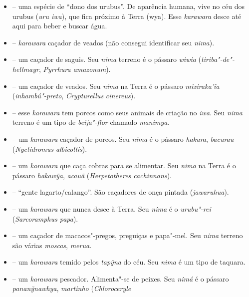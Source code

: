 \begin{itemize}
  principalmente na ilha de Marajó. Os Guajá, embora estejam
  relativamente distantes da região endêmica dessa ave, disseram que a
  conhecem.
\item
  \emph{} -- uma espécie de ``dono dos urubus''. De
  aparência humana, vive no céu dos urubus (\emph{uru iwa}), que fica
  próximo à Terra (wya). Esse \emph{karawara} desce até aqui para beber
  e buscar água.
\item
  \emph{} -- \emph{karawara} caçador de veados (não
  consegui identificar seu \emph{nima}).
\item
  \emph{} -- um caçador de saguis. Seu \emph{nima}
  terreno é o pássaro \emph{wiwia} (\emph{tiriba"-de"-hellmayr},
  \emph{Pyrrhura amazonum}).
\item
  \emph{} -- um caçador de veados. Seu \emph{nima} na
  Terra é o pássaro \emph{mixiraka'ĩa} (\emph{inhambú"-preto},
  \emph{Crypturellus} \emph{cinereus}).
\item
  \emph{} -- esse \emph{karawara} tem porcos como
  seus animais de criação no \emph{iwa}. Seu \emph{nima} terreno é um
  tipo de \emph{beija"-flor} chamado \emph{manimya}.
\item
  \emph{} -- um \emph{karawara} caçador de porcos. Seu
  \emph{nima} é o pássaro \emph{hakura}, \emph{bacurau}
  (\emph{Nyctidromus albicollis}).
\item
  \emph{} -- um \emph{karawara} que caça cobras para
  se alimentar. Seu \emph{nima} na Terra é o pássaro \emph{hakawỹa},
  \emph{acauã} (\emph{Herpetotheres cachinnans}).
\item
  \emph{} -- ``gente lagarto/calango''. São caçadores
  de onça pintada (\emph{jawaruhua}).
\item
  \emph{} -- um \emph{karawara} que nunca desce à
  Terra. Seu \emph{nima} é o \emph{urubu"-rei} (\emph{Sarcoramphus
  papa}).
\item
  \emph{} -- um caçador de macacos"-pregos, preguiças e
  papa"-mel. Seu \emph{nima} terreno são várias \emph{moscas},
  \emph{merua}.
\item
  \emph{} -- um \emph{karawara} temido pelos
  \emph{tapỹna} do céu. Seu \emph{nima} é um tipo de taquara.
\item
  \emph{} -- um \emph{karawara} pescador.
  Alimenta"-se de peixes. Seu \emph{nimá} é o pássaro
  \emph{pananỹnawhya}, \emph{martinho} (\emph{Chloroceryle
}
\end{itemize}
